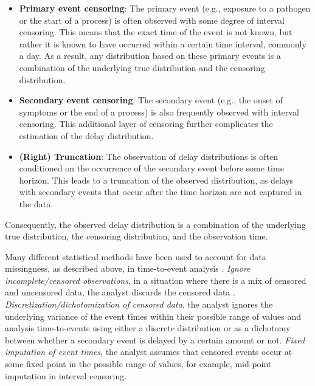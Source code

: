 \documentclass[10pt,letterpaper]{article}
\begin{document}
\begin{itemize}
    \item \textbf{Primary event censoring}: The primary event (e.g., exposure to a pathogen or the start of a process) is often observed with some degree of interval censoring. This means that the exact time of the event is not known, but rather it is known to have occurred within a certain time interval, commonly a day. As a result, any distribution based on these primary events is a combination of the underlying true distribution and the censoring distribution.

    \item \textbf{Secondary event censoring}: The secondary event (e.g., the onset of symptoms or the end of a process) is also frequently observed with interval censoring. This additional layer of censoring further complicates the estimation of the delay distribution.
    
    \item \textbf{(Right) Truncation}: The observation of delay distributions is often conditioned on the occurrence of the secondary event before some time horizon. This leads to a truncation of the observed distribution, as delays with secondary events that occur after the time horizon are not captured in the data.     
\end{itemize}

Consequently, the observed delay distribution is a combination of the underlying true distribution, the censoring distribution, and the observation time.

Many different statistical methods have been used to account for data missingness, as described above, in time-to-event analysis \cite{leung1997censoring}. \textit{Ignore incomplete/censored observations}, in a situation where there is a mix of censored and uncensored data, the analyst discards the censored data \cite{little2019statistical}. \textit{Discretization/dichotomization of censored data}, the analyst ignores the underlying variance of the event times within their possible range of values and analysis time-to-events using either a discrete distribution or as a dichotomy between whether a secondary event is delayed by a certain amount or not. \textit{Fixed imputation of event times}, the analyst assumes that censored events occur at some fixed point in the possible range of values, for example, mid-point imputation in interval censoring. 
\end{document}
